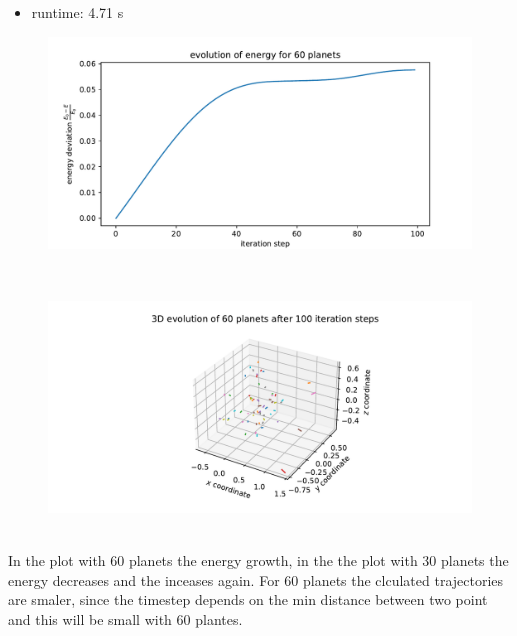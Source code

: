         \newpage
        \begin{itemize}
            \item runtime: 4.71 s
        \end{itemize}
        \begin{figure}[h!]
            \centering
            \includegraphics[width=\textwidth]{./figures/task2_60body_energy_new_e.pdf}
        \end{figure} \ \\ 
        \begin{figure}[h!]
            \centering
            \includegraphics[width=\textwidth]{./figures/task2_60body_3D_new_e.pdf}
        \end{figure} \ \\ 
In the plot with 60 planets the energy growth, in the the plot with 30 planets the energy decreases and the inceases again. For 60 planets the clculated trajectories are smaler, since the timestep depends on the min distance between two point and this will be small with 60 plantes. 